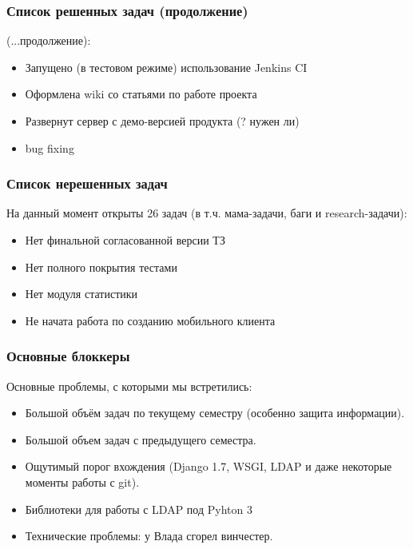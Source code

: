 \documentclass{beamer}
\newlength{\wideitemsep}
\let\olditem\item
\renewcommand{\item}{\setlength{\itemsep}{\wideitemsep}\olditem}
\begin{document}
\begin{frame}
\frametitle{Список решенных задач (продолжение)}

(...продолжение):
\begin{itemize}
\item Запущено (в тестовом режиме) использование Jenkins CI
\item Оформлена wiki со статьями по работе проекта
\item Развернут сервер с демо-версией продукта (? нужен ли)
\item bug fixing
\end{itemize}


\end{frame}


\begin{frame}
\frametitle{Список нерешенных задач}

На данный момент открыты 26 задач (в т.ч. мама-задачи, баги и research-задачи):
\begin{itemize}
\item Нет финальной согласованной версии ТЗ
\item Нет полного покрытия тестами
\item Нет модуля статистики
\item Не начата работа по созданию мобильного клиента
\end{itemize}


\end{frame}


\begin{frame}
\frametitle{Основные блоккеры}

Основные проблемы, с которыми мы встретились:
\begin{itemize}
\item Большой объём задач по текущему семестру (особенно защита информации).
\item Большой объем задач с предыдущего семестра.
\item Ощутимый порог вхождения (Django 1.7, WSGI, LDAP и даже некоторые моменты работы с git).
\item Библиотеки для работы с LDAP под Pyhton 3
\item Технические проблемы: у Влада сгорел винчестер.
\end{itemize}


\end{frame}
\end{document}
